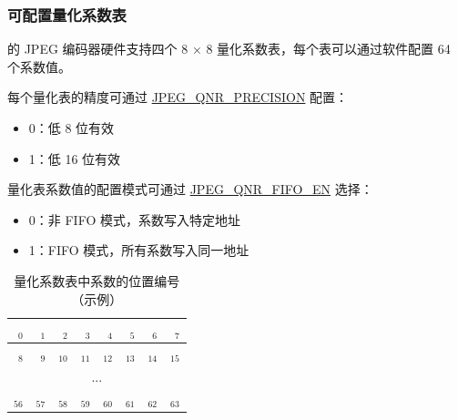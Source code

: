 \documentclass[main\_\_CN.tex]{subfiles}
\begin{document}
\begin{table}[H]
\begin{threeparttable}
\begin{tablenotes}
{        }
    \end{tablenotes}

    \end{threeparttable}
\end{table}

\subsubsection{可配置量化系数表}
\label{sec:jpegcodec-enc-qnr}

\chipname{} 的 JPEG 编码器硬件支持四个 8 × 8 量化系数表，每个表可以通过软件配置 64 个系数值。

每个量化表的精度可通过 \hyperref[fielddesc:JPEGQNRPRECISION]{JPEG\_QNR\_PRECISION} 配置：
\begin{itemize}
\item 0：低 8 位有效
\item 1：低 16 位有效
\end{itemize}

量化表系数值的配置模式可通过 \hyperref[fielddesc:JPEGQNRFIFOEN]{JPEG\_QNR\_FIFO\_EN} 选择：
\begin{itemize}
\item 0：非 FIFO 模式，系数写入特定地址
\item 1：FIFO 模式，所有系数写入同一地址
\end{itemize}

\begin{longtable}{ | r | r | r | r | r | r | r | r | }
\caption{量化系数表中系数的位置编号（示例）} \label{tab:example_qnr}
\\ \hline
 $_{0}$ & $_{1}$ & $_{2}$ & $_{3}$ & $_{4}$ & $_{5}$ & $_{6}$ & $_{7}$ \\ \hline
 $_{8}$ & $_{9}$ & $_{10}$ & $_{11}$ & $_{12}$ & $_{13}$ & $_{14}$ & $_{15}$ \\ \hline
 \multicolumn{8}{c}{...} \\ \hline
 $_{56}$ & $_{57}$ & $_{58}$ & $_{59}$ & $_{60}$ & $_{61}$ & $_{62}$ & $_{63}$ \\ \hline
\end{longtable}
\end{document}
